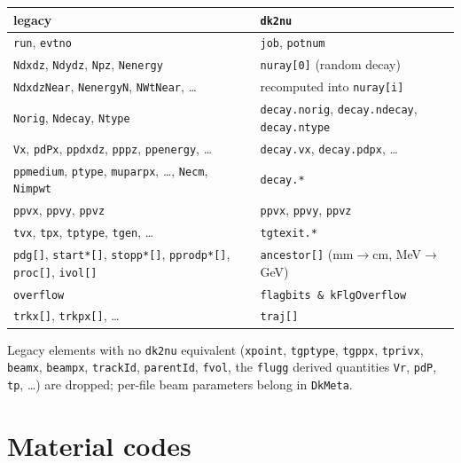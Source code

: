 \documentclass[11pt]{article}
\newcommand{\code}[1]{\texttt{#1}}
\newcommand{\dktwonu}{\texttt{dk2nu}\xspace}
\begin{document}
\begin{center}\small
\begin{tabular}{ll}
\toprule
\textbf{legacy} & \textbf{\dktwonu} \\ \midrule
\code{run}, \code{evtno} & \code{job}, \code{potnum} \\
\code{Ndxdz}, \code{Ndydz}, \code{Npz}, \code{Nenergy} & \code{nuray[0]} (random decay) \\
\code{NdxdzNear}, \code{NenergyN}, \code{NWtNear}, \ldots & recomputed into \code{nuray[i]} \\
\code{Norig}, \code{Ndecay}, \code{Ntype} & \code{decay.norig}, \code{decay.ndecay}, \code{decay.ntype} \\
\code{Vx}, \code{pdPx}, \code{ppdxdz}, \code{pppz}, \code{ppenergy}, \ldots & \code{decay.vx}, \code{decay.pdpx}, \ldots \\
\code{ppmedium}, \code{ptype}, \code{muparpx}, \ldots, \code{Necm}, \code{Nimpwt} & \code{decay.*} \\
\code{ppvx}, \code{ppvy}, \code{ppvz} & \code{ppvx}, \code{ppvy}, \code{ppvz} \\
\code{tvx}, \code{tpx}, \code{tptype}, \code{tgen}, \ldots & \code{tgtexit.*} \\
\code{pdg[]}, \code{start*[]}, \code{stopp*[]}, \code{pprodp*[]}, \code{proc[]}, \code{ivol[]} & \code{ancestor[]} (mm$\to$cm, MeV$\to$GeV) \\
\code{overflow} & \code{flagbits \& kFlgOverflow} \\
\code{trkx[]}, \code{trkpx[]}, \ldots & \code{traj[]} \\
\bottomrule
\end{tabular}
\end{center}
Legacy elements with no \dktwonu equivalent (\code{xpoint},
\code{tgptype}, \code{tgppx}, \code{tprivx}, \code{beamx}, \code{beampx},
\code{trackId}, \code{parentId}, \code{fvol}, the \code{flugg}
derived quantities \code{Vr}, \code{pdP}, \code{tp}, \ldots) are dropped;
per-file beam parameters belong in \code{DkMeta}.

\section{Material codes}\label{app:materials}
\end{document}
